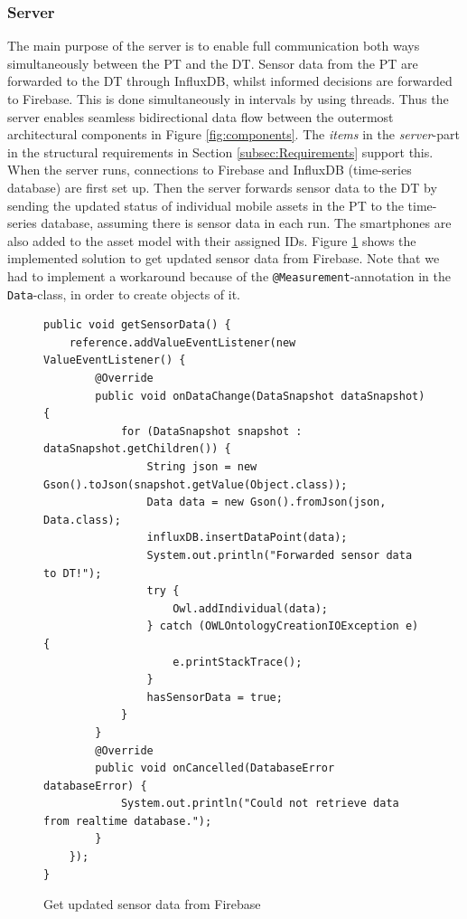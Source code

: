 \documentclass{article}
\begin{document}
\subsubsection{Server}
The main purpose of the server is to enable full communication both ways simultaneously between the PT and the DT. Sensor data from the PT are forwarded to the DT through InfluxDB, whilst informed decisions are forwarded to Firebase. This is done simultaneously in intervals by using threads. Thus the server enables seamless bidirectional data flow between the outermost architectural components in Figure \ref{fig:components}. The \emph{items} in the \emph{server}-part in the structural requirements in Section \ref{subsec:Requirements} support this. When the server runs, connections to Firebase and InfluxDB (time-series database) are first set up. Then the server forwards sensor data to the DT by sending the updated status of individual mobile assets in the PT to the time-series database, assuming there is sensor data in each run. The smartphones are also added to the asset model with their assigned IDs. Figure \ref{fig:server_get_sensor_data} shows the implemented solution to get updated sensor data from Firebase. Note that we had to implement a workaround because of the \verb|@Measurement|-annotation in the \verb|Data|-class, in order to create objects of it.

\begin{figure}
    \centering
    \begin{small}
    \begin{verbatim}
public void getSensorData() {
    reference.addValueEventListener(new ValueEventListener() {
        @Override
        public void onDataChange(DataSnapshot dataSnapshot) {
            for (DataSnapshot snapshot : dataSnapshot.getChildren()) {
                String json = new Gson().toJson(snapshot.getValue(Object.class));
                Data data = new Gson().fromJson(json, Data.class);
                influxDB.insertDataPoint(data);
                System.out.println("Forwarded sensor data to DT!");
                try {
                    Owl.addIndividual(data);
                } catch (OWLOntologyCreationIOException e) {
                    e.printStackTrace();
                }
                hasSensorData = true;
            }
        }
        @Override
        public void onCancelled(DatabaseError databaseError) {
            System.out.println("Could not retrieve data from realtime database.");
        }
    });
}
    \end{verbatim}
    \end{small}
    \caption{Get updated sensor data from Firebase}
    \label{fig:server_get_sensor_data}
\end{figure}
\end{document}
